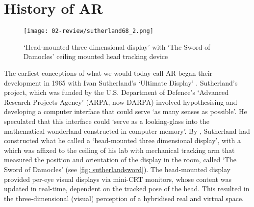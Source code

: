 \section{History of AR}\label{sec: ar-history}
\begin{wrapfigure}{r}{0.45\textwidth}
    \hfill
    \begin{minipage}{0.95\linewidth}
        \texttt{[image: 02-review/sutherland68\_2.png]}
        \captionsetup{justification=justified}
        \caption{`Head-mounted three dimensional display' with `The Sword of Damocles' ceiling mounted head tracking device \citep[in][]{sutherland1968}}\label{fig: sutherlandsword}
    \end{minipage}
\end{wrapfigure}
The earliest conceptions of what we would today call AR began their development in 1965 with Ivan Sutherland's `Ultimate Display' \citeyearpar{sutherland1965}. Sutherland's project, which was funded by the U.S. Department of Defence's `Advanced Research Projects Agency' (ARPA, now DARPA) involved hypothesising and developing a computer interface that could serve `as many senses as possible'. He speculated that this interface could `serve as a looking-glass into the mathematical wonderland constructed in computer memory'. By \citeyear{sutherland1968}, Sutherland had constructed what he called a `head-mounted three dimensional display', with a which was affixed to the ceiling of his lab with mechanical tracking arm that measured the position and orientation of the display in the room, called `The Sword of Damocles' (see \autoref{fig: sutherlandsword}). The head-mounted display provided per-eye visual displays via mini-CRT monitors, whose content was updated in real-time, dependent on the tracked pose of the head. This resulted in the three-dimensional (visual) perception of a hybridised real and virtual space.

